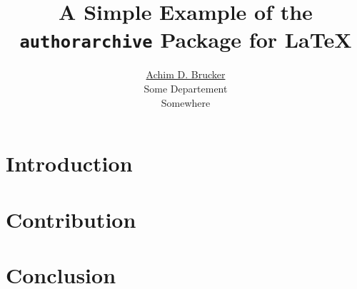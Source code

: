 \documentclass[english]{lni}
\title{A Simple Example of the \texttt{authorarchive} Package for \LaTeX}
\author{%
    \protect\href{http://www.brucker.ch/}{Achim D. Brucker}\\
    Some Departement\\ 
    Somewhere
}
\begin{document}
  \maketitle{}

  \begin{abstract}
      \lipsum[1-2]
  \end{abstract}

  \section{Introduction}
  \lipsum[1-4]

  \section{Contribution}
  \lipsum[5-10]

  \section{Conclusion}
  \lipsum[11-12]
\end{document}

